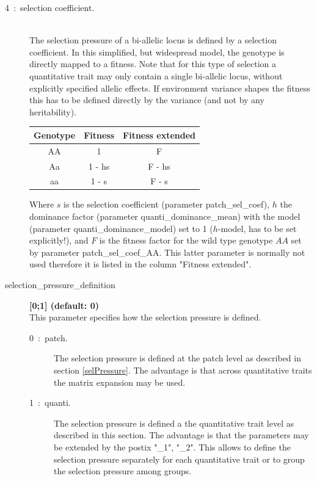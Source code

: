 \documentclass[letterpaper,12pt,oneside]{book}
\begin{document}
\begin{description}
\begin{description}
\item [4~:~selection coefficient.] \textbf{}\\
The selection pressure of a bi-allelic locus is defined by a selection coefficient. In this simplified, but widespread model, the genotype is directly mapped to a fitness. Note that for this type of selection a quantitative trait may only contain a single bi-allelic locus, without explicitly specified allelic effects. If environment variance shapes the fitness this has to be defined directly by the variance (and not by any heritability). \\

\begin{tabular}{ccc}
 \hline            
Genotype & Fitness & Fitness extended \\
\hline
AA & 1 			& F      \\
Aa & 1 - hs & F - hs \\
aa & 1 - s 	& F - s  \\
\hline
\end{tabular}

Where $s$ is the selection coefficient (parameter \textsf{patch\_sel\_coef}), $h$ the dominance factor (parameter  \textsf{quanti\_dominance\_mean}) with the model (parameter  \textsf{quanti\_dominance\_model}) set to 1 ($h$-model, has to be set explicitly!), and $F$ is the fitness factor for the wild type genotype $AA$ set by parameter  \textsf{patch\_sel\_coef\_AA}. This latter parameter is normally not used therefore it is listed in the column "Fitness extended".
 
\end{description}
\end{description}





\begin{description}
\item[selection\_pressure\_definition\index{}]\textbf{[0;1] (default: 0)}\\
This parameter specifies how the selection pressure is defined. 
\begin{description}
\item[0~:~patch.] The selection pressure is defined at the patch level as described in section \ref{selPressure}. The advantage is that across quantitative traits the matrix expansion may be used.
\item[1~:~quanti.] The selection pressure is defined a the quantitative trait level as described in this section. The advantage is that the parameters may be extended by the postix "\_1", "\_2". This allows to define the selection pressure separately for each quantitative trait or to group the selection pressure among groups.
\end{description}
\end{description}
\end{document}
